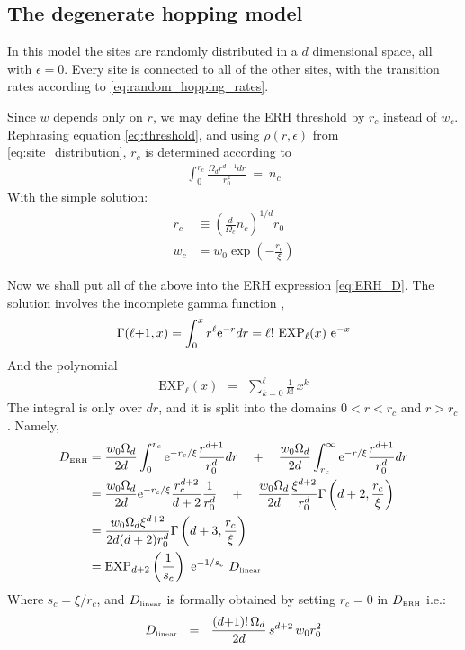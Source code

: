 \subsection{The degenerate hopping model}

In this model the sites are randomly distributed in a $d$ dimensional 
space, all with $\epsilon=0$. Every site is connected to all of the other
sites, with the transition rates according to \ref{eq:random_hopping_rates}.

Since $w$ depends only on $r$, we may define the ERH threshold by
$r_c$ instead of $w_c$. Rephrasing equation \ref{eq:threshold}, and 
using $\rho(r,\epsilon)$ from \ref{eq:site_distribution}, $r_c$ is determined according to
%
\begin{align}
\int_0^{r_c} \frac{\Omega_d r^{d-1} dr}{r_0^2} \ = \  n_c 
\end{align}
%
With the simple solution:
%
\begin{align}
r_c  &\equiv \left(\frac{d}{\Omega_c}n_c\right)^{1/d}  r_0 \\
w_c &= w_0\exp\left(-\frac{r_c}{\xi}\right) 
\end{align}
%

Now we shall put all of the above into the ERH expression \ref{eq:ERH_D}.
The solution involves the incomplete gamma function \cite{_nist_????},
%
\begin{align}
\Gamma(\ell{+}1,x) = \int_0^x r^{\ell} \mbox{e}^{-r} dr = 
\ell! \ \mbox{EXP}_{\ell}(x)  \ \mbox{e}^{-x}
\end{align}
%
And the polynomial
%
\begin{align}\label{eq:EXP}
\mathrm{EXP}_{\ell}(x) \ \ = \ \ \sum_{k=0}^{\ell} \frac{1}{k!} \, x^k
\end{align}
% 
The integral is only over $dr$, and it is split  
into the domains ${0<r<r_c}$ and ${r>r_c}$. 
Namely, 
%
\begin{align}
D_{\tbox{ERH}} &= 
\frac{w_0\Omega_d}{2d}\int_0^{r_c} \eexp{-r_c / \xi} \frac{r^{d+1}}{r_0^d} dr 
\nonumber 
\quad+\quad \frac{w_0\Omega_d}{2d}\int_{r_c}^\infty \eexp{-r / \xi} \frac{r^{d+1}}{r_0^d} dr 
\nonumber \\
&= \frac{w_0\Omega_d}{2d} \eexp{-r_c / \xi} \frac{r_c^{d+2}}{d+2} \frac{1}{r_0^d}
\nonumber 
\quad+\quad \frac{w_0\Omega_d}{2d} \frac{\xi^{d+2}}{r_0^d} \Gamma\left(d+2,\frac{r_c}{\xi}\right)
\nonumber \\
&= \frac{w_0\Omega_d \xi^{d+2}}{2d(d+2)r_0^d}\Gamma\left(d+3,\frac{r_c}{\xi}\right)\\
&= \mathrm{EXP}_{d{+}2}\left(\frac{1}{s_c}\right)  \  \eexp{-1/s_c}  \ D_{\tbox{linear}}
\end{align}
%
Where $s_c=\xi/r_c$, and $D_{\mbox{\tiny linear}}$ is formally obtained by setting
$r_c=0$ in $D_{\mbox{\tiny ERH}}$  i.e.:
%
\begin{align}\label{eq:D_linear}
D_{\mbox{\tiny linear}} \ \ = \ \  
\frac{(d{+}1)!\,\Omega_d}{2d} \, s^{d{+}2} \, w_0 r_0^2
\end{align}

